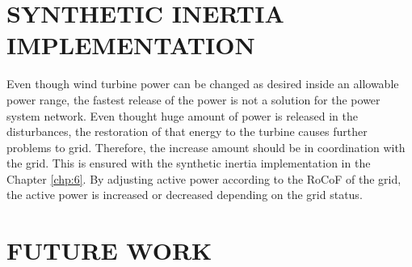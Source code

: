 \section{SYNTHETIC INERTIA IMPLEMENTATION}
Even though wind turbine power can be changed as desired inside an allowable power range, the fastest release of the power is not a solution for the power system network. Even thought huge amount of power is released in the disturbances, the restoration of that energy to the turbine causes further problems to grid. Therefore, the increase amount should be in coordination with the grid. This is ensured with the synthetic inertia implementation in the Chapter \ref{chp:6}. By adjusting active power according to the RoCoF of the grid, the active power is increased or decreased depending on the grid status. 
\section{FUTURE WORK}